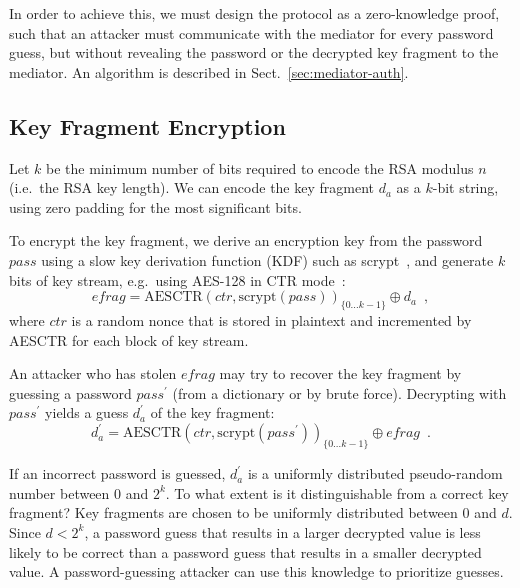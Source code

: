 \documentclass{llncs}
\begin{document}
In order to achieve this, we must design the protocol as a zero-knowledge proof, such that an
attacker must communicate with the mediator for every password guess, but without revealing the
password or the decrypted key fragment to the mediator. An algorithm is described in
Sect.~\ref{sec:mediator-auth}.

\subsection{Key Fragment Encryption}\label{sec:fragment-encryption}

Let $k$ be the minimum number of bits required to encode the RSA modulus $n$ (i.e.\ the RSA key
length). We can encode the key fragment $d_a$ as a $k$-bit string, using zero padding for the most
significant bits.

To encrypt the key fragment, we derive an encryption key from the password $\mathit{pass}$ using a
slow key derivation function (KDF) such as scrypt~\cite{Percival09}, and generate $k$ bits of key
stream, e.g.\ using AES-128 in CTR mode~\cite{Lipmaa00}:
\begin{equation}
\mathit{efrag} =
    \mathrm{AESCTR}(\mathit{ctr}, \mathrm{scrypt}(\mathit{pass}))_{\{0 \dots k-1\}} \oplus d_a
    \enspace,
\end{equation}
where $\mathit{ctr}$ is a random nonce that is stored in plaintext and incremented by AESCTR for
each block of key stream.

An attacker who has stolen $\mathit{efrag}$ may try to recover the key fragment by guessing a
password $\mathit{pass}^\prime$ (from a dictionary or by brute force). Decrypting with
$\mathit{pass}^\prime$ yields a guess $d_a^\prime$ of the key fragment:
\begin{equation}
d_a^\prime =
    \mathrm{AESCTR}(\mathit{ctr}, \mathrm{scrypt}(\mathit{pass}^\prime))_{\{0 \dots k-1\}} \oplus \mathit{efrag}
    \enspace.
\end{equation}

If an incorrect password is guessed, $d_a^\prime$ is a uniformly distributed pseudo-random number
between 0 and $2^k$. To what extent is it distinguishable from a correct key fragment? Key fragments
are chosen to be uniformly distributed between 0 and $d$. Since $d < 2^k$, a password guess that
results in a larger decrypted value is less likely to be correct than a password guess that results
in a smaller decrypted value. A password-guessing attacker can use this knowledge to prioritize
guesses.
\end{document}
